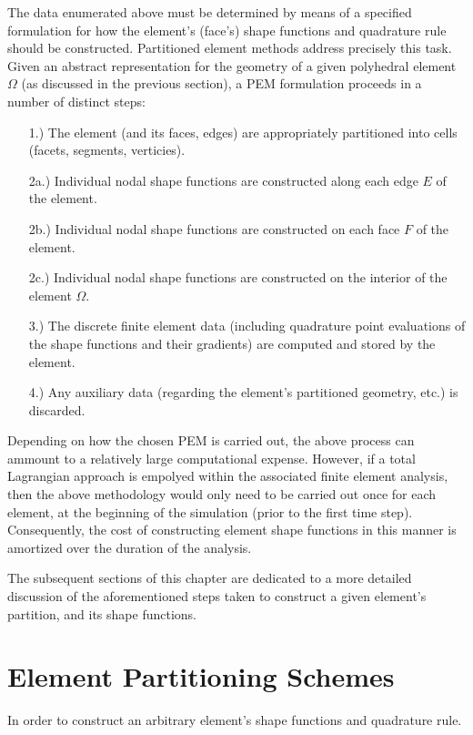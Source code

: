 	The data enumerated above must be determined by means of a specified formulation for how the element's (face's) shape functions and quadrature rule should be constructed. Partitioned element methods address precisely this task. Given an abstract representation for the geometry of a given polyhedral element $\Omega$ (as discussed in the previous section), a PEM formulation proceeds in a number of distinct steps:
	\begin{itemize}
		\item[1.)] The element (and its faces, edges) are appropriately partitioned into cells (facets, segments, verticies).
		\item[2a.)] Individual nodal shape functions are constructed along each edge $E$ of the element.
		\item[2b.)] Individual nodal shape functions are constructed on each face $F$ of the element.
		\item[2c.)] Individual nodal shape functions are constructed on the interior of the element $\Omega$.
		\item[3.)] The discrete finite element data (including quadrature point evaluations of the shape functions and their gradients) are computed and stored by the element.
		\item[4.)] Any auxiliary data (regarding the element's partitioned geometry, etc.) is discarded.
	\end{itemize}
	
	Depending on how the chosen PEM is carried out, the above process can ammount to a relatively large computational expense. However, if a total Lagrangian approach is empolyed within the associated finite element analysis, then the above methodology would only need to be carried out once for each element, at the beginning of the simulation (prior to the first time step). Consequently, the cost of constructing element shape functions in this manner is amortized over the duration of the analysis.
	
	The subsequent sections of this chapter are dedicated to a more detailed discussion of the aforementioned steps taken to construct a given element's partition, and its shape functions.
	
\section{Element Partitioning Schemes}

	In order to construct an arbitrary element's shape functions and quadrature rule.


